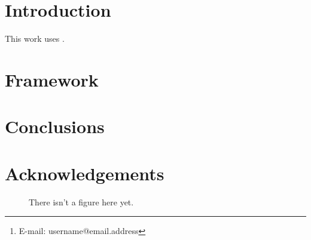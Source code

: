 \documentclass{mn2e}
\date{}
\title[]{}
\author[Author list]%
{First Last \thanks{E-mail: username@email.address}\\%
Institute
}
\begin{document}
\maketitle

\label{firstpage}

\begin{abstract}
\end{abstract}

\begin{keywords}
\end{keywords}

\section{Introduction}
\label{introduction}

This work uses \cite{2012MNRAS.425.3077L}.

\section{Framework}
\label{framework}

\section{Conclusions}
\label{conclusions}

\section*{Acknowledgements}

\def\mnras{MNRAS}




\begin{figure}
\caption{\label{fig:dummy} There isn't a figure here yet.}
\end{figure}
\end{document}

